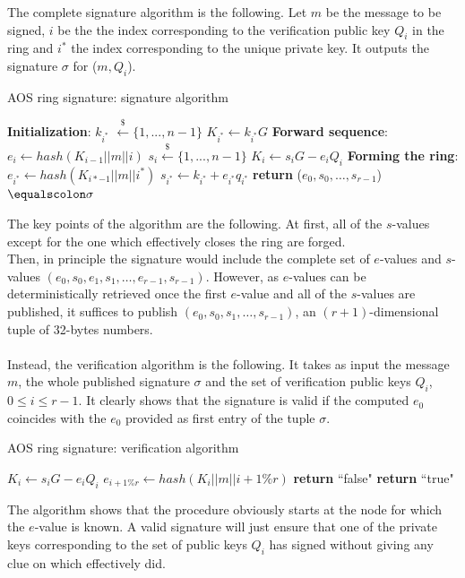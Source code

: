 The complete signature algorithm is the following. Let $m$ be the message to be signed, $i$ be the the index corresponding to the verification public key $Q_i$ in the ring and $i^{*}$ the index corresponding to the unique private key. It outputs the signature $\sigma$ for ($m, Q_i$).
\begin{algorithm}[H]
	\caption{AOS ring signature: signature algorithm}
	\label{alg:AOS_sign}
	\begin{algorithmic}[1]
		\State \textbf{Initialization}:
		\State $k_{i^{*}}$ $\xleftarrow{\text{\$}} \{1, ..., n - 1\}$
		\State $K_{i^{*}} \gets k_{i^{*}}G$
		\State \textbf{Forward sequence}:
		\State $e_i \gets hash(K_{i-1}||m||i)$
		\State $s_i\xleftarrow{\text{\$}} \{1, ..., n - 1\}$
		\State $K_i \gets s_iG - e_iQ_i$
		\EndFor
		\State \textbf{Forming the ring}:
		\State $e_{i^{*}} \gets hash(K_{i{*}-1}||m||i^{*})$
		\State $s_{i^{*}} \gets k_{i^{*}} + e_{i^{*}}q_{i^{*}}$
		\State \textbf{return} ($e_0, s_0, \dots, s_{r-1}$)$\equalscolon \sigma$
		\EndProcedure
	\end{algorithmic}
\end{algorithm}
\noindent
The key points of the algorithm are the following. At first, all of the $s$-values except for the one which effectively closes the ring are forged.\\
Then, in principle the signature would include the complete set of $e$-values and $s$-values $(e_0, s_0, e_1, s_1, \dots, e_{r-1}, s_{r-1})$. However, as $e$-values can be deterministically retrieved once the first $e$-value and all of the $s$-values are published, it suffices to publish $(e_0, s_0, s_1, \dots, s_{r-1})$, an $(r+1)$-dimensional tuple of 32-bytes numbers. \\ \ \\
Instead, the verification algorithm is the following. It takes as input the message $m$, the whole published signature $\sigma$ and the set of verification public keys $Q_i$, $0 \leq i \leq r-1$. It clearly shows that the signature is valid if the computed $e_0$ coincides with the $e_0$ provided as first entry of the tuple $\sigma$.
\begin{algorithm}[H]
	\caption{AOS ring signature: verification algorithm}
	\label{alg:AOS_verify}
	\begin{algorithmic}[1]
		\State $K_i \gets s_iG - e_iQ_i$
		\State $e_{i+1\%r} \gets hash(K_i||m||i+1\%r)$
		\EndFor
		\State \textbf{return} ``false"
		\EndIf
		\State \textbf{return} ``true"
		\EndIf 
		\EndProcedure
	\end{algorithmic}
\end{algorithm}
\noindent
The algorithm shows that the procedure obviously starts at the node for which the $e$-value is known. A valid signature will just ensure that one of the private keys corresponding to the set of public keys $Q_i$ has signed without giving any clue on which effectively did.

